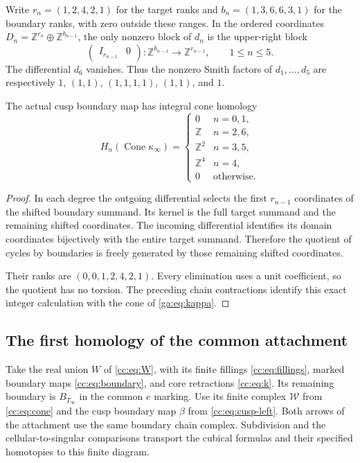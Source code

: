 Write $r_n=(1,2,4,2,1)$ for the target ranks and
$b_n=(1,3,6,6,3,1)$ for the boundary ranks, with zero outside these ranges.
In the ordered coordinates $D_n=\mathbb Z^{r_n}\oplus\mathbb Z^{b_{n-1}}$,
the only nonzero block of $d_n$ is the upper-right block
\begin{equation}\label{ga:eq:reduced-d}
\begin{pmatrix}I_{r_{n-1}}&0\end{pmatrix}
:\mathbb Z^{b_{n-1}}\longrightarrow\mathbb Z^{r_{n-1}},
\qquad 1\leq n\leq5.
\end{equation}
The differential $d_6$ vanishes.
Thus the nonzero Smith factors of $d_1,\ldots,d_5$ are respectively
$1$, $(1,1)$, $(1,1,1,1)$, $(1,1)$, and $1$.

\begin{theorem}\label{ga:thm:relative}
The actual cusp boundary map has integral cone homology
\[
H_n(\operatorname{Cone}\kappa_\infty)=
\begin{cases}
0&n=0,1,\\
\mathbb Z&n=2,6,\\
\mathbb Z^2&n=3,5,\\
\mathbb Z^4&n=4,\\
0&\text{otherwise}.
\end{cases}
\]
\end{theorem}

\begin{proof}
In each degree the outgoing differential selects the first $r_{n-1}$
coordinates of the shifted boundary summand.
Its kernel is the full target summand and the remaining shifted coordinates.
The incoming differential identifies its domain coordinates bijectively
with the entire target summand. Therefore the quotient of cycles by
boundaries is freely generated by those remaining shifted coordinates.

Their ranks are $(0,0,1,2,4,2,1)$.
Every elimination uses a unit coefficient, so the quotient has no torsion.
The preceding chain contractions identify this exact integer calculation
with the cone of \eqref{ga:eq:kappa}.
\end{proof}

\subsection{The first homology of the common attachment}

Take the real union $W$ of \eqref{cc:eq:W}, with its finite
fillings \eqref{cc:eq:fillings}, marked boundary maps
\eqref{cc:eq:boundary}, and core retractions \eqref{cc:eq:k}.
Its remaining boundary is $B_{T_\infty}$ in the common $e$ marking.
Use its finite complex $\mathcal W$ from \eqref{cc:eq:cone}
and the cusp boundary map $\beta$ from \eqref{cc:eq:cusp-left}.
Both arrows of the attachment use the same boundary chain complex.
Subdivision and the cellular-to-singular comparisons transport the
cubical formulas and their specified homotopies to this finite diagram.

